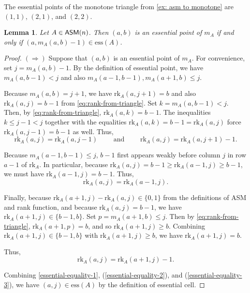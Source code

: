 \documentclass[12 pt]{amsart}
\newtheorem{lemma}[Theorem]{Lemma}
\numberwithin{equation}{section}
\newcommand{\rk}{\mathrm{rk}}
\newcommand{\ess}{\mathrm{ess}}
\theoremstyle{remark}
\newenvironment{example}
  {\pushQED{\qed}\renewcommand{\qedsymbol}{$\diamondsuit$}\examplex}
  {\popQED\endexamplex}
\newcommand{\asm}{{\sf ASM}}
\begin{document}
\begin{example}
    The essential points of the monotone triangle from \cref{ex: asm to monotone} are $(1,1)$, $(2,1)$, and $(2,2)$.
\end{example}

\begin{lemma}
\label{lemma:monotone_essential_set_translation}
    Let $A\in \asm(n)$.  Then $(a,b)$ is an essential point of $m_A$ if and only if $(a,m_A(a,b)-1)\in \ess(A)$.
\end{lemma}

\begin{proof}

\noindent $(\Rightarrow)$ Suppose that $(a,b)$ is an essential point of $m_A$.  For convenience, set $j=m_A(a,b)-1$.  By the definition of essential point, we have $m_A(a,b-1)< j$ and also $m_A(a-1,b-1),m_A(a+1,b)\leq j$.

Because $m_A(a,b)=j+1$, we have $\rk_A(a,j+1)=b$ and also $\rk_A(a,j)=b-1$ from \cref{eq:rank-from-triangle}.  Set $k = m_A(a,b-1)<j$.  Then, by \cref{eq:rank-from-triangle}, $\rk_A(a,k)=b-1$.  The inequalities $k \leq j-1<j$ together with the equalities $\rk_A(a,k)=b-1 = \rk_A(a,j)$ force $\rk_A(a,j-1)=b-1$ as well.  Thus, \begin{equation}\label{essential-equality-1}
    \rk_A(a,j) = \rk_A(a,j-1) \qquad \mbox{ and } \qquad \rk_A(a,j) = \rk_A(a,j+1)-1.
\end{equation}

Because $m_A(a-1,b-1)\leq j$, $b-1$ first appears weakly before column $j$ in row $a-1$ of $\rk_A$.  In particular, because $\rk_A(a,j)=b-1\geq \rk_A(a-1,j)\geq b-1$, we must have $\rk_A(a-1,j)=b-1$. Thus, \begin{equation}\label{essential-equality-2}
    \rk_A(a,j) = \rk_A(a-1,j).
\end{equation}

Finally, because $\rk_A(a+1,j)-\rk_A(a,j) \in \{0,1\}$ from the definitions of ASM and rank function, and because $\rk_A(a,j)=b-1$, we have $\rk_A(a+1,j)\in\{b-1,b\}$.  Set $p = m_A(a+1,b)\leq j$. Then by \cref{eq:rank-from-triangle}, $\rk_A(a+1,p) = b$, and so $\rk_A(a+1,j)\geq b$.  Combining $\rk_A(a+1,j)\in\{b-1,b\}$ with $\rk_A(a+1,j)\geq b$, we have $\rk_A(a+1,j) = b$.

Thus, \begin{equation}\label{essential-equality-3}
    \rk_A(a,j) = \rk_A(a+1,j)-1.
\end{equation}

Combining \cref{essential-equality-1}, (\ref{essential-equality-2}), and (\ref{essential-equality-3}), we have $(a,j) \in \ess(A)$ by the definition of essential cell.


\end{proof}
\end{document}
